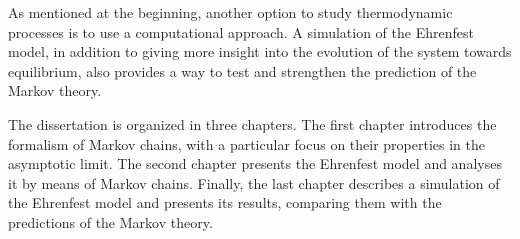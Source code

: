 As mentioned at the beginning, another option to study thermodynamic processes is to use a computational approach. A simulation of the Ehrenfest model, in addition to giving more insight into the evolution of the system towards equilibrium, also provides a way to test and strengthen the prediction of the Markov theory.

The dissertation is organized in three chapters. The first chapter introduces the formalism of Markov chains, with a particular focus on their properties in the asymptotic limit. The second chapter presents the Ehrenfest model and analyses it by means of Markov chains. Finally, the last chapter describes a simulation of the Ehrenfest model and presents its results, comparing them with the predictions of the Markov theory. 